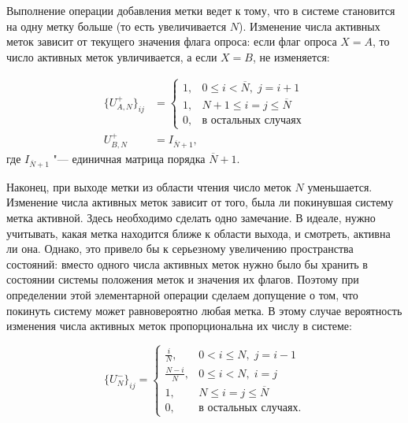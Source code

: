 Выполнение операции добавления метки ведет к тому, что в системе становится на одну метку больше (то есть увеличивается $N$). Изменение числа активных меток зависит от текущего значения флага опроса: если флаг опроса $X = A$, то число активных меток увличивается, а если $X = B$, не изменяется:

\begin{equation}\label{eq:ch3_bg_tag_arrival}
	\begin{aligned}
		\{ U_{A,N}^+ \}_{ij} &= \begin{cases}
			1, & 0 \leqslant i < \overline{N}, \; j = i + 1\\
			1, & N+1 \leqslant i = j \leqslant \overline{N}\\
			0, & \text{в остальных случаях}
	 	\end{cases}\\
		U_{B,N}^+ &= I_{\overline{N}+1},
 	\end{aligned}
\end{equation}
где $I_{\overline{N}+1}$ "--- единичная матрица порядка $\overline{N}+1$.

Наконец, при выходе метки из области чтения число меток $N$ уменьшается. Изменение числа активных меток зависит от того, была ли покинувшая систему метка активной. Здесь необходимо сделать одно замечание. В идеале, нужно учитывать, какая метка находится ближе к области выхода, и смотреть, активна ли она. Однако, это привело бы к серьезному увеличению пространства состояний: вместо одного числа активных меток нужно было бы хранить в состоянии системы положения меток и значения их флагов. Поэтому при определении этой элементарной операции сделаем допущение о том, что покинуть систему может равновероятно любая метка. В этому случае вероятность изменения числа активных меток пропорциональна их числу в системе:

\begin{equation}\label{eq:ch3_bg_tag_departure}
	\{ U_{N}^- \}_{ij} = \begin{cases}
		\frac{i}{N},     & 0 < i \leqslant N,\; j = i - 1\\
		\frac{N - i}{N}, & 0 \leqslant i < N,\; i = j\\
		1,               & N \leqslant i = j \leqslant \overline{N}\\
		0,               & \text{в остальных случаях.}
 	\end{cases}
\end{equation}

